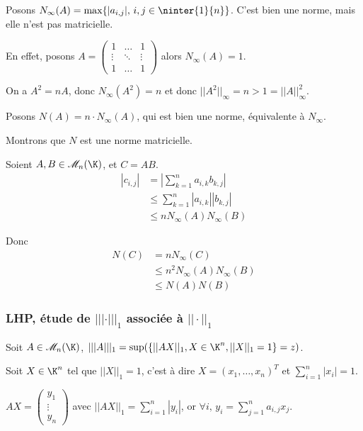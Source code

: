 \begin{exemple}
    Posons $N_\infty(A) = \max\{ |a_{i, j}|, \, i, j \in \ninter{1}{n}\}$. 
    C'est bien une norme, mais elle n'est pas matricielle. 

    En effet, posons 
    $A = \begin{pmatrix}
        1 & \dots & 1 \\
        \vdots & \ddots & \vdots \\
        1 & \dots & 1
    \end{pmatrix}$ alors $N_\infty(A) = 1$.

    On a $A^2 = nA$, donc $N_\infty(A^2) = n$ et donc $||A^2||_\infty = n > 1 = ||A||_\infty^2$. 

    \lvspace Posons $N(A) = n \cdot N_\infty(A)$, qui est bien une norme, équivalente à $N_\infty$.

    Montrons que $N$ est une norme matricielle.

    Soient $A, B \in \mathscr M_n(\K)$, et $C = AB$. 
    \begin{align*}
        |c_{i, j}| & = \left| \sum_{k=1}^n a_{i, k} b_{k, j} \right| \\
        & \leqslant \sum_{k=1}^n |a_{i, k}| |b_{k, j}| \\
        & \leqslant n N_\infty(A) N_\infty(B)
    \end{align*}

    Donc 
    \begin{align*}
        N(C) & = n N_\infty(C) \\
        & \leqslant n^2 N_\infty(A) N_\infty(B) \\
        &  \leqslant N(A) N(B)
    \end{align*}


\end{exemple}


\subsubsection{LHP, étude de $||| \cdot |||_1$ associée à $|| \cdot ||_1$}


Soit $A \in \mathscr M_n(\K)$, $|||A|||_1 = \sup (\{ ||AX||_1, X \in \K^n, ||X||_1 = 1 \} = z) $.

Soit $X \in \K^n$ tel que $||X||_1 = 1$, c'est à dire $X = (x_1, \ldots, x_n)^T$ et $\sum_{i=1}^n |x_i| = 1$.

$AX = \begin{pmatrix}
    y_1 \\
    \vdots \\
    y_n
\end{pmatrix}$  avec $||AX||_1 = \sum_{i=1}^n |y_i|$, 
or $\displaystyle \forall i, \, y_i = \sum_{j=1}^n a_{i, j} x_j$. 

